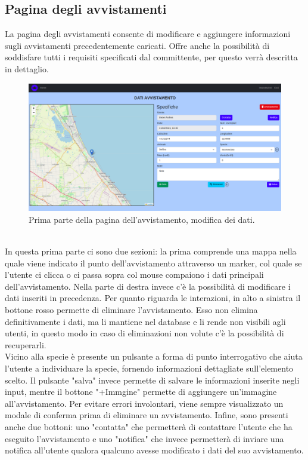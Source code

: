 \documentclass[a4paper,final,12pt]{report}
\begin{document}
\subsection{Pagina degli avvistamenti}
La pagina degli avvistamenti consente di modificare e aggiungere informazioni sugli avvistamenti precedentemente caricati. Offre anche la possibilità di soddisfare tutti i requisiti specificati dal committente, per questo verrà descritta in dettaglio.
\begin{figure}[hbtp]
\centering
\includegraphics[scale=0.22]{img_concettuale/avvistamentoPAG.png}
\caption{Prima parte della pagina dell'avvistamento, modifica dei dati.}
\end{figure}
\\In questa prima parte ci sono due sezioni: la prima comprende una mappa nella quale viene indicato il punto dell'avvistamento attraverso un marker, col quale se l'utente ci clicca o ci passa sopra col mouse compaiono i dati principali dell'avvistamento. Nella parte di destra invece c'è la possibilità di modificare i dati inseriti in precedenza.
Per quanto riguarda le interazioni, in alto a sinistra il bottone rosso permette di eliminare l'avvistamento. Esso non elimina definitivamente i dati, ma li mantiene nel database e li rende non visibili agli utenti, in questo modo in caso di eliminazioni non volute c'è la possibilità di recuperarli.\\
Vicino alla specie è presente un pulsante a forma di punto interrogativo che aiuta l'utente a individuare la specie, fornendo informazioni dettagliate sull'elemento scelto.  
Il pulsante "salva" invece permette di salvare le informazioni inserite negli input, mentre il bottone "+Immgine" permette di aggiungere un'immagine all'avvistamento. Per evitare errori involontari, viene sempre visualizzato un modale di conferma prima di eliminare un avvistamento. Infine, sono presenti anche due bottoni: uno "contatta" che permetterà di contattare l'utente che ha eseguito l'avvistamento e uno "notifica" che invece permetterà di inviare una notifica all'utente qualora qualcuno avesse modificato i dati del suo avvistamento.
\end{document}
